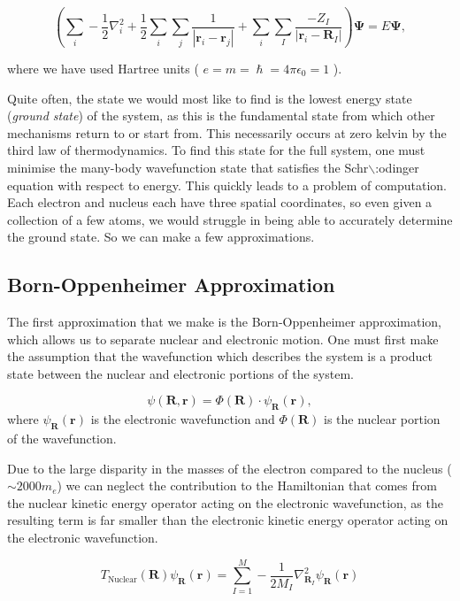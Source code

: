 \documentclass[11pt]{article}
\begin{document}
\[( \sum_{i} - \frac{1}{2} \nabla_{i}^{2} + \frac{1}{2} \sum_i\sum_j    \frac{1}{| \mathbf{r}_i - \mathbf{r}_j |}+ \sum_i\sum_I \frac{-Z_I}{| \mathbf{r}_i - \mathbf{R}_I |} ) \mathbf{ \Psi } = E \mathbf{ \Psi },\]


where we have used Hartree units ( \(e = m = \hslash = 4\pi\epsilon_0 = 1\) ). 

Quite often, the state we would most like to find is the lowest energy state (\emph{ground state})
of the system, as this is the fundamental state from which other mechanisms return to or start
from. This necessarily occurs at zero kelvin by the third law of thermodynamics. To find this
state for the full system, one must minimise the many-body wavefunction state that satisfies
the Schr$\backslash$:odinger equation with respect to energy. This quickly leads to a problem of
computation. Each electron and nucleus each have three spatial coordinates, so even given a
collection of a few atoms, we would struggle in being able to accurately determine the ground
state. So we can make a few approximations. 

\subsection{Born-Oppenheimer Approximation}
\label{sec:orge10daf6}

The first approximation that we make is the Born-Oppenheimer approximation, which allows us to
separate nuclear and electronic motion. One must first make the assumption that the
wavefunction which describes the system is a product state between the nuclear and electronic
portions of the system.

\[ \psi(\mathbf{R}, \mathbf{r}) = \Phi(\mathbf{R}) \cdot \psi_{\mathbf{R}}(\mathbf{r}), \]
where \(\psi_{\mathbf{R}}(\mathbf{r})\) is the electronic wavefunction and \(\Phi(\mathbf{R})\) is
the nuclear portion of the wavefunction.

 Due to the large disparity in the masses of the
electron compared to the nucleus (\(\sim 2000 m_e\)) we can neglect the contribution to the
Hamiltonian that comes from the nuclear kinetic energy operator acting on the electronic
wavefunction, as the resulting term is far smaller than the electronic kinetic energy operator acting on the
electronic wavefunction.

\[T_{\text{Nuclear}}(\mathbf{R}) \psi_{\mathbf{R}}(\mathbf{r}) = \sum_{I =
1}^{M} - \frac{1}{2M_{I}} \nabla^{2}_{\mathbf{R}_{I}} \psi_{\mathbf{R}}(\mathbf{r})\]
\end{document}
